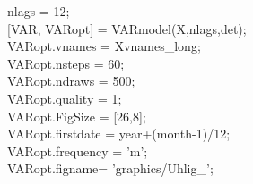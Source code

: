 \hspace{1mm}\hspace{5mm} \hspace{5mm} \hspace{5mm} nlags = 12; \\ 
\hspace{1mm}\hspace{5mm} \hspace{5mm} \hspace{5mm} [VAR, VARopt] = VARmodel(X,nlags,det); \\ 
\hspace{1mm}\hspace{5mm} \hspace{5mm} \hspace{5mm} VARopt.vnames = Xvnames\_long; \\ 
\hspace{1mm}\hspace{5mm} \hspace{5mm} \hspace{5mm} VARopt.nsteps = 60; \\ 
\hspace{1mm}\hspace{5mm} \hspace{5mm} \hspace{5mm} VARopt.ndraws = 500; \\ 
\hspace{1mm}\hspace{5mm} \hspace{5mm} \hspace{5mm} VARopt.quality = 1; \\ 
\hspace{1mm}\hspace{5mm} \hspace{5mm} \hspace{5mm} VARopt.FigSize = [26,8]; \\ 
\hspace{1mm}\hspace{5mm} \hspace{5mm} \hspace{5mm} VARopt.firstdate = year+(month-1)/12; \\ 
\hspace{1mm}\hspace{5mm} \hspace{5mm} \hspace{5mm} VARopt.frequency = \textcolor{matlabpurple}{'m'}; \\ 
\hspace{1mm}\hspace{5mm} \hspace{5mm} \hspace{5mm} VARopt.figname= \textcolor{matlabpurple}{'graphics/Uhlig\_'}; \\ 

